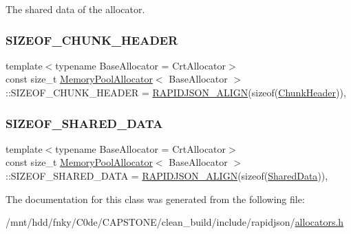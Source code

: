 The shared data of the allocator. 

\mbox{\label{classMemoryPoolAllocator_a195c16fcdba57918869168c48d97737f}} 
\subsubsection{\texorpdfstring{S\+I\+Z\+E\+O\+F\+\_\+\+C\+H\+U\+N\+K\+\_\+\+H\+E\+A\+D\+ER}{SIZEOF\_CHUNK\_HEADER}}
{\footnotesize\ttfamily template$<$typename Base\+Allocator = Crt\+Allocator$>$ \\
const size\+\_\+t \hyperlink{classMemoryPoolAllocator}{Memory\+Pool\+Allocator}$<$ Base\+Allocator $>$\+::S\+I\+Z\+E\+O\+F\+\_\+\+C\+H\+U\+N\+K\+\_\+\+H\+E\+A\+D\+ER = \hyperlink{group__RAPIDJSON__CONFIG_ga583915242504c7fdb36e826f02f76242}{R\+A\+P\+I\+D\+J\+S\+O\+N\+\_\+\+A\+L\+I\+GN}(sizeof(\hyperlink{structMemoryPoolAllocator_1_1ChunkHeader}{Chunk\+Header}))\hspace{0.3cm}{\ttfamily [static]}, {\ttfamily [private]}}

\mbox{\label{classMemoryPoolAllocator_aa2538f9ce977f511009747f60b1ae552}} 
\subsubsection{\texorpdfstring{S\+I\+Z\+E\+O\+F\+\_\+\+S\+H\+A\+R\+E\+D\+\_\+\+D\+A\+TA}{SIZEOF\_SHARED\_DATA}}
{\footnotesize\ttfamily template$<$typename Base\+Allocator = Crt\+Allocator$>$ \\
const size\+\_\+t \hyperlink{classMemoryPoolAllocator}{Memory\+Pool\+Allocator}$<$ Base\+Allocator $>$\+::S\+I\+Z\+E\+O\+F\+\_\+\+S\+H\+A\+R\+E\+D\+\_\+\+D\+A\+TA = \hyperlink{group__RAPIDJSON__CONFIG_ga583915242504c7fdb36e826f02f76242}{R\+A\+P\+I\+D\+J\+S\+O\+N\+\_\+\+A\+L\+I\+GN}(sizeof(\hyperlink{structMemoryPoolAllocator_1_1SharedData}{Shared\+Data}))\hspace{0.3cm}{\ttfamily [static]}, {\ttfamily [private]}}



The documentation for this class was generated from the following file\+:\begin{DoxyCompactItemize}
\item 
/mnt/hdd/fnky/\+C0de/\+C\+A\+P\+S\+T\+O\+N\+E/clean\+\_\+build/include/rapidjson/\hyperlink{allocators_8h}{allocators.\+h}\end{DoxyCompactItemize}
